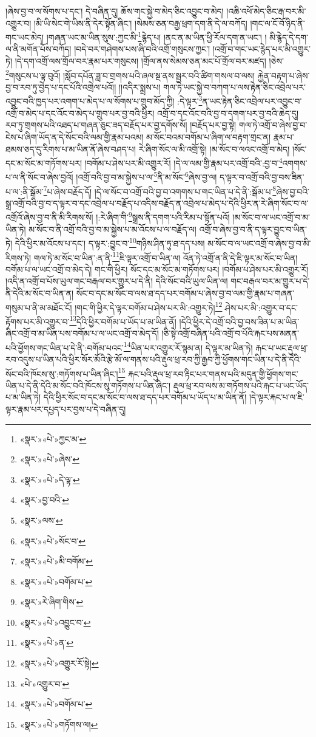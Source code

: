 །ཞེས་བྱ་བ་ལ་སོགས་པ་དང་། དེ་བཞིན་དུ། ཆོས་གང་སྐྱེ་བ་མེད་ཅིང་འབྱུང་བ་མེད། །འཆི་འཕོ་མེད་ཅིང་རྒ་བར་མི་འགྱུར་བ། །མི་ཡི་སེང་གེ་ཡིས་ནི་དེར་སྟོན་ཞིང་། །སེམས་ཅན་བརྒྱ་ཕྲག་དག་ནི་དེ་ལ་བཀོད། །གང་ལ་ངོ་བོ་ཉིད་ནི་གང་ཡང་མེད། །གཞན་ཡང་མ་ཡིན་སུས་:ཀྱང་མི་\footnote{«སྣར་»«པེ་»ཀྱང་མ་}རྙེད་པ། །ནང་ན་མ་ཡིན་ཕྱི་རོལ་དག་ན་ཡང་། །
མི་རྙེད་དེ་དག་ལ་ནི་མགོན་པོས་བཀོད། །བདེ་བར་གཤེགས་པས་ཞི་བའི་འགྲོ་གསུངས་ཀྱང་། །འགྲོ་བ་གང་ཡང་རྙེད་པར་མི་འགྱུར་ཏེ། །དེ་དག་འགྲོ་ལས་གྲོལ་བར་རྣམ་པར་གསུངས། །གྲོལ་ནས་སེམས་ཅན་མང་པོ་གྲོལ་བར་མཛད། །ཅེས་\footnote{«སྣར་»«པེ་»ཞེས་}གསུངས་པ་ལྟ་བུའོ། །སློབ་དཔོན་ཟླ་བ་གྲགས་པའི་ཞལ་སྔ་ནས་སྦྱར་བའི་ཚིག་གསལ་བ་ལས། རྐྱེན་བརྟག་པ་ཞེས་བྱ་བ་རབ་ཏུ་བྱེད་པ་དང་པོའི་འགྲེལ་པའོ།། །།འདིར་སྨྲས་པ། གལ་ཏེ་ཡང་སྐྱེ་བ་བཀག་པ་ལས་རྟེན་ཅིང་འབྲེལ་པར་འབྱུང་བའི་ཁྱད་པར་འགག་པ་མེད་པ་ལ་སོགས་པ་གྲུབ་མོད་ཀྱི། :དེ་ལྟར་\footnote{«སྣར་»«པེ་»དེ་ལྟ་}ན་ཡང་རྟེན་ཅིང་འབྲེལ་པར་འབྱུང་བ་འགྲོ་བ་མེད་པ་དང་འོང་བ་མེད་པ་གྲུབ་པར་བྱ་བའི་ཕྱིར། འགྲོ་བ་དང་འོང་བའི་བྱ་བ་དགག་པར་བྱ་བའི་ཆེད་དུ། རབ་ཏུ་གྲགས་པའི་འཐད་པ་གཞན་ཅུང་ཟད་བརྗོད་པར་བྱ་དགོས་སོ། །བརྗོད་པར་བྱ་སྟེ། གལ་ཏེ་འགྲོ་བ་ཞེས་བྱ་བ་ངེས་པ་ཞིག་ཡོད་ན་དེ་སོང་བའི་ལམ་གྱི་རྣམ་པའམ། མ་སོང་བའམ་བགོམ་པ་ཞིག་ལ་བརྟག་གྲང་ན། རྣམ་པ་ཐམས་ཅད་དུ་རིགས་པ་མ་ཡིན་ནོ་ཞེས་བཤད་པ། རེ་ཞིག་སོང་ལ་མི་འགྲོ་སྟེ། །མ་སོང་བ་ལའང་འགྲོ་བ་མེད། །སོང་དང་མ་སོང་མ་གཏོགས་པར། །བགོམ་པ་ཤེས་པར་མི་འགྱུར་རོ། །དེ་ལ་ལམ་གྱི་རྣམ་པར་འགྲོ་བའི་:བྱ་བ་\footnote{«སྣར་»བྱ་བའི་}འགགས་པ་ལ་ནི་སོང་བ་ཞེས་བྱའོ། །འགྲོ་བའི་བྱ་བ་མ་སྐྱེས་པ་ལ་\footnote{«སྣར་»ལས་}ནི་མ་སོང་\footnote{«སྣར་»«པེ་»སོང་བ་}ཞེས་བྱ་ལ། ད་ལྟར་བ་འགྲོ་བའི་བྱ་བས་ཟིན་པ་ལ་:ནི་སྒོམ་\footnote{«སྣར་»«པེ་»མི་བགོམ་}པ་ཞེས་བརྗོད་དོ། །དེ་ལ་སོང་བ་འགྲོ་བའི་བྱ་བ་འགགས་པ་གང་ཡིན་པ་དེ་ནི་:སྒོམ་པ་\footnote{«སྣར་»«པེ་»བགོམ་པ་}ཞེས་བྱ་བའི་སྒྲ་འགྲོ་བའི་བྱ་བ་ད་ལྟར་བ་དང་འབྲེལ་པ་བརྗོད་པ་འདིས་བརྗོད་ན་འབྲེལ་པ་མེད་པ་དེའི་ཕྱིར་ན་རེ་ཞིག་སོང་བ་ལ་འགྲོའོ་ཞེས་བྱ་བ་ནི་མི་རིགས་སོ། །:རེ་ཞིག་གི་\footnote{«སྣར་»རེ་ཞིག་གིས་}སྒྲས་ནི་དགག་པའི་རིམ་པ་སྟོན་པའོ། །མ་སོང་བ་ལ་ཡང་འགྲོ་བ་མ་ཡིན་ཏེ། མ་སོང་བ་ནི་འགྲོ་བའི་བྱ་བ་མ་སྐྱེས་པ་མ་འོངས་པ་ལ་བརྗོད་ལ། འགྲོ་བ་ཞེས་བྱ་བ་ནི་ད་ལྟར་བྱུང་བ་ཡིན་ཏེ། དེའི་ཕྱིར་མ་འོངས་པ་དང་། ད་ལྟར་:བྱུང་བ་\footnote{«སྣར་»«པེ་»འབྱུང་བ་}གཉིས་ཤིན་ཏུ་ཐ་དད་པས། མ་སོང་བ་ལ་ཡང་འགྲོ་བ་ཞེས་བྱ་བ་མི་རིགས་ཏེ། གལ་ཏེ་མ་སོང་བ་ཡིན་:ན་ནི་\footnote{«སྣར་»«པེ་»ན་}ཇི་ལྟར་འགྲོ་བ་ཡིན་ལ། འོན་ཏེ་འགྲོ་ན་ནི་དེ་ཇི་ལྟར་མ་སོང་བ་ཡིན། བགོམ་པ་ལ་ཡང་འགྲོ་བ་མེད་དེ། གང་གི་ཕྱིར། སོང་དང་མ་སོང་མ་གཏོགས་པར། །བགོམ་པ་ཤེས་པར་མི་འགྱུར་རོ། །འདི་ན་འགྲོ་བ་པོས་ཡུལ་གང་བརྒལ་བར་གྱུར་པ་དེ་ནི། དེའི་སོང་བའི་ཡུལ་ཡིན་ལ། གང་བརྒལ་བར་མ་གྱུར་པ་དེ་ནི་དེའི་མ་སོང་བ་ཡིན་ན། སོང་བ་དང་མ་སོང་བ་ལས་ཐ་དད་པར་བགོམ་པ་ཞེས་བྱ་བ་ལམ་གྱི་རྣམ་པ་གཞན་གསུམ་པ་ནི་མ་མཐོང་ངོ། །གང་གི་ཕྱིར་དེ་ལྟར་བགོམ་པ་ཤེས་པར་མི་:འགྱུར་ཏེ།\footnote{«སྣར་»«པེ་»འགྱུར་རོ་སྟེ།} ཤེས་པར་མི་:འགྱུར་བ་དང་རྟོགས་པར་མི་འགྱུར་བ་\footnote{«པེ་»འགྱུར་བ་}དེའི་ཕྱིར་བགོམ་པ་ཡོད་པ་མ་ཡིན་ནོ། །དེའི་ཕྱིར་དེ་འགྲོ་བའི་བྱ་བས་ཟིན་པ་མ་ཡིན་ཞིང་འགྲོ་བ་མ་ཡིན་པས་བགོམ་པ་ལ་ཡང་འགྲོ་བ་མེད་དོ། །ཅི་སྟེ་འགྲོ་བཞིན་པའི་འགྲོ་བ་པོའི་རྐང་པས་མནན་པའི་ཕྱོགས་གང་ཡིན་པ་དེ་ནི་:བགོམ་པའང་\footnote{«སྣར་»«པེ་»བགོམ་པ་}ཡིན་པར་འགྱུར་རོ་སྙམ་ན། དེ་ལྟར་མ་ཡིན་ཏེ། རྐང་པ་ཡང་རྡུལ་ཕྲ་རབ་འདུས་པ་ཡིན་པའི་ཕྱིར་སོར་མོའི་རྩེ་མོ་ལ་གནས་པའི་རྡུལ་ཕྲ་རབ་ཀྱི་རྒྱབ་ཀྱི་ཕྱོགས་གང་ཡིན་པ་དེ་ནི་དེའི་སོང་བའི་ཁོངས་སུ་:གཏོགས་པ་ཡིན་ཞིང་།\footnote{«སྣར་»«པེ་»གཏོགས་ལ།} རྐང་པའི་རྡུལ་ཕྲ་རབ་རྟིང་པར་གནས་པའི་མདུན་གྱི་ཕྱོགས་གང་ཡིན་པ་དེ་ནི་དེའི་མ་སོང་བའི་ཁོངས་སུ་གཏོགས་པ་ཡིན་ཞིང་། རྡུལ་ཕྲ་རབ་ལས་མ་གཏོགས་པའི་རྐང་པ་ཡང་ཡོད་པ་མ་ཡིན་ཏེ། དེའི་ཕྱིར་སོང་བ་དང་མ་སོང་བ་ལས་ཐ་དད་པར་བགོམ་པ་ཡོད་པ་མ་ཡིན་ནོ། །དེ་ལྟར་རྐང་པ་ལ་ཇི་ལྟར་རྣམ་པར་དཔྱད་པར་བྱས་པ་དེ་བཞིན་དུ། 
